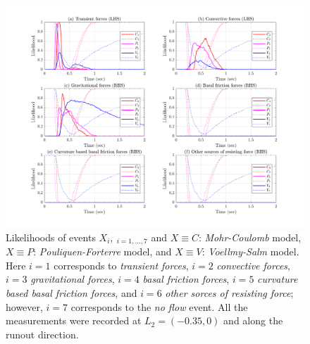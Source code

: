 \documentclass{article}
\begin{document}
\begin{figure}[H]
        \centering
        \includegraphics[width=1\textwidth]{InclinedPlane/LocalRecords/DominancePrX_L2.png}
        \caption{Likelihoods of events $X_i, \ _{i=1,...,7}$ and $X \equiv C$: \emph{Mohr-Coulomb} model, $X \equiv P$: \emph{Pouliquen-Forterre} model, and $X \equiv V$: \emph{Voellmy-Salm} model. Here $i=1$ corresponds to \emph{transient forces}, $i=2$ \emph{convective forces}, $i=3$ \emph{gravitational forces}, $i=4$ \emph{basal friction forces}, $i=5$ \emph{curvature based basal friction forces}, and $i=6$ \emph{other sorces of resisting force}; however, $i=7$ corresponds to the \emph{no flow} event. All the measurements were recorded at $L_2=(-0.35,0)$ and along the runout direction.}
        \label{fig:Ramp-FXDominance-L2}
\end{figure}
\end{document}

